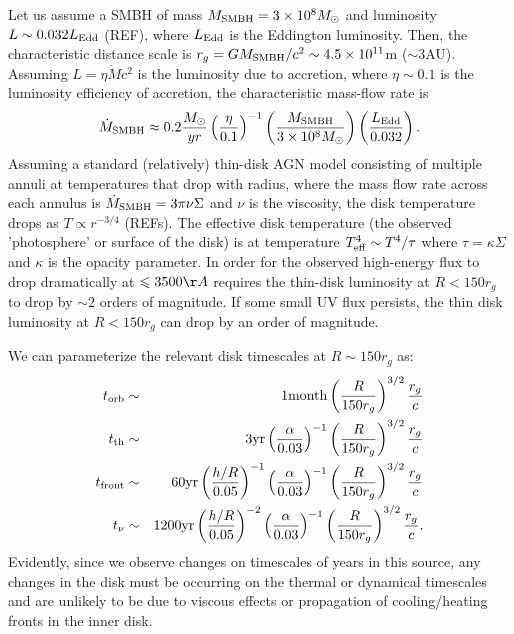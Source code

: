 \documentclass{mnras}
\begin{document}
Let us assume a SMBH of mass $M_{\rm SMBH}=3 \times 10^{8}M_{\odot}$ and luminosity $L \sim 0.032L_{\rm Edd}$ (REF), where $L_{\rm Edd}$ is the Eddington luminosity. Then, the characteristic distance scale is $r_{g}=GM_{\rm SMBH}/c^{2} \sim 4.5 \times 10^{11}$m ($\sim 3$AU). Assuming $L =\eta \dot{M}c^{2}$ is the luminosity due to accretion, where $\eta \sim 0.1$ is the luminosity efficiency of accretion, the characteristic mass-flow rate is
\begin{equation}
\dot{M}_{\rm SMBH} \approx 0.2\frac{M_{\odot}}{yr} \left( \frac{\eta}{0.1}\right)^{-1} \left( \frac{M_{\rm SMBH}}{3 \times 10^{8}M_{\odot}}\right)\left(\frac{L_{\rm Edd}}{0.032}\right).
\label{eq:m_dot}
\end{equation}
Assuming a standard (relatively) thin-disk AGN model consisting of multiple annuli at temperatures that drop with radius, where the mass flow rate across each annulus is $\dot{M}_{\rm SMBH}=3\pi\nu\Sigma$ and $\nu$ is the viscosity, the disk temperature drops as $T \propto r^{-3/4}$ (REFs). The effective disk temperature (the observed 'photosphere' or surface of the disk) is at temperature $T_{\rm eff}^{4} \sim T^{4}/\tau$ where $\tau=\kappa \Sigma$ and $\kappa$ is the opacity parameter. In order for the observed high-energy flux to drop dramatically at $\leq 3500\AA$ requires the thin-disk luminosity at $R<150r_{g}$ to drop by $\sim 2$ orders of magnitude. If some small UV flux persists, the thin disk luminosity at $R<150r_{g}$ can drop by an order of magnitude. 

We can parameterize the relevant disk timescales at $R\sim 150r_{g}$ as:
\begin{eqnarray}
t_{\rm orb} & \sim & 1{\rm month} \left(\frac{R}{150r_{g}}\right)^{3/2} \frac{r_{g}}{c}\\
t_{\rm th} & \sim & 3{\rm yr} \left(\frac{\alpha}{0.03}\right)^{-1}\left(\frac{R}{150r_{g}}\right)^{3/2} \frac{r_{g}}{c}\\
t_{\rm front} & \sim & 60{\rm yr} \left(\frac{h/R}{0.05}\right)^{-1}\left(\frac{\alpha}{0.03}\right)^{-1}\left(\frac{R}{150r_{g}}\right)^{3/2} \frac{r_{g}}{c}\\
t_{\nu} & \sim & 1200{\rm yr} \left(\frac{h/R}{0.05}\right)^{-2}\left(\frac{\alpha}{0.03}\right)^{-1}\left(\frac{R}{150r_{g}}\right)^{3/2} \frac{r_{g}}{c}.
\end{eqnarray}
Evidently, since we observe changes on timescales of years in this source, any changes in the disk must be occurring on the thermal or dynamical timescales and are unlikely to be due to viscous effects or propagation of cooling/heating fronts in the inner disk.
\end{document}
